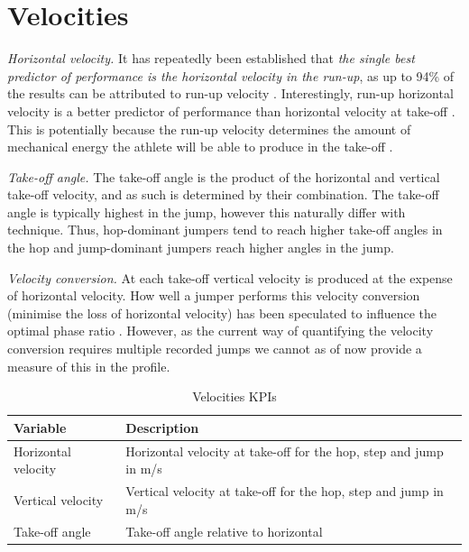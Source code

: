 \documentclass[]{scrreprt}
\begin{document}
\clearpage

\hypertarget{velocities}{%
\section{Velocities}\label{velocities}}

\emph{Horizontal velocity.} It has repeatedly been established that \emph{the single best predictor of performance is the horizontal velocity in the run-up}, as up to 94\% of the results can be attributed to run-up velocity \autocites{Fukashiro1981}{Bayraktar2017}{Liu2015}. Interestingly, run-up horizontal velocity is a better predictor of performance than horizontal velocity at take-off \autocite{Bayraktar2017}. This is potentially because the run-up velocity determines the amount of mechanical energy the athlete will be able to produce in the take-off \autocite{Fukashiro1981}. ~

\emph{Take-off angle.} The take-off angle is the product of the horizontal and vertical take-off velocity, and as such is determined by their combination. The take-off angle is typically highest in the jump, however this naturally differ with technique. Thus, hop-dominant jumpers tend to reach higher take-off angles in the hop and jump-dominant jumpers reach higher angles in the jump. ~

\emph{Velocity conversion.} At each take-off vertical velocity is produced at the expense of horizontal velocity. How well a jumper performs this velocity conversion (minimise the loss of horizontal velocity) has been speculated to influence the optimal phase ratio \autocites{Liu2012}{Yu1996}. However, as the current way of quantifying the velocity conversion requires multiple recorded jumps we cannot as of now provide a measure of this in the profile. ~

\begin{table}[!h]

\caption{\label{tab:velocity-desc}Velocities KPIs}
\centering
\begin{tabular}[t]{>{\raggedright\arraybackslash}p{15em}|l}
\hline
Variable & Description\\
\hline
Horizontal velocity & Horizontal velocity at take-off for the hop, step and jump in m/s\\
\hline
Vertical velocity & Vertical velocity at take-off for the hop, step and jump in m/s\\
\hline
Take-off angle & Take-off angle relative to horizontal\\
\hline
\end{tabular}
\end{table}
\end{document}
